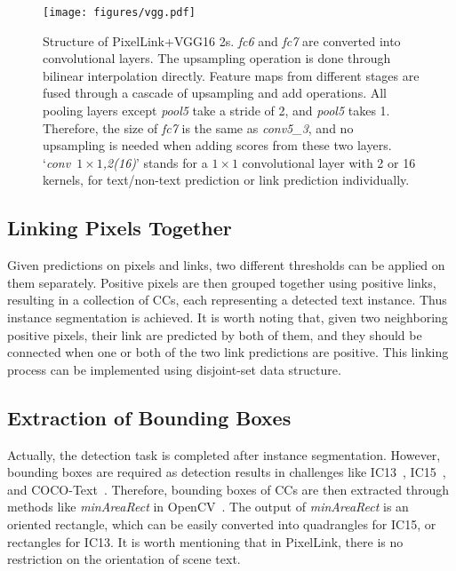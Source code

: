 \documentclass[letterpaper]{article} \usepackage{aaai18}  \usepackage{times}  \usepackage{helvet}  \usepackage{courier}  \usepackage{url}  \usepackage{graphicx}
\begin{document}
	\begin{figure}[t!]
		\centering
		\texttt{[image: figures/vgg.pdf]}
		\caption{Structure of PixelLink+VGG16 2s.
			\emph{fc6 }and \emph{fc7} are converted into convolutional layers. The upsampling operation is done through bilinear interpolation directly. Feature maps from different stages are fused through a cascade of upsampling and add operations. All pooling layers except \emph{pool5} take a stride of 2, and \emph{pool5} takes 1. Therefore, the size of \emph{fc7} is the same as \emph{conv5\_3}, and no upsampling is needed when adding scores from these two layers. \mbox{`\emph{conv $1\times1$,2(16)}'} stands for a $1\times 1$ convolutional layer with 2 or 16 kernels, for text/non-text prediction or link prediction individually.}
		\label{figure:vgg16}
	\end{figure}
	
	\subsection{Linking Pixels Together}
	\label{sec:linking-pixels-together}
	Given predictions on pixels and links, two different thresholds can be applied  on them separately. Positive pixels are then grouped together using positive links, resulting in a collection of CCs, each representing a detected text instance. Thus instance segmentation is achieved.  It is worth noting that, given two neighboring positive pixels, their link are predicted by both of them, and they should be connected when one or both of the two link predictions are positive. This linking process can be implemented using disjoint-set data structure. 
	
	
	\subsection{Extraction of Bounding Boxes}
	Actually, the detection task is completed after instance segmentation. However, bounding boxes are required as detection results in challenges like IC13~\cite{Karatzas2013ICDAR}, IC15~\cite{Karatzas2015ICDAR}, and COCO-Text~\cite{Veit2016COCO}. Therefore, bounding boxes of CCs are then extracted through methods like \emph{minAreaRect} in OpenCV~\cite{opencv}. The output of \emph{minAreaRect} is an oriented rectangle, which can be easily converted into quadrangles for IC15, or rectangles for IC13. It is worth mentioning that in PixelLink, there is no restriction on the orientation of scene text.
	
\end{document}
